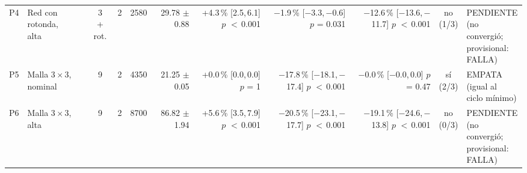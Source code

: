 \begin{table}[H]
\begin{tabular}{llcrrrrrrcl}
P4 & \makecell[l]{Red con\\{}rotonda,\\{}alta} & \makecell[c]{3\\{}+ rot.} & 2 & 2580 & \makecell[r]{29.78\\{}$\pm$ 0.88} & \makecell[r]{+4.3\,\%\\{}[2.5,\,6.1]\\$p$ $<$\,0.001} & \makecell[r]{$-$1.9\,\%\\{}[$-$3.3,\,$-$0.6]\\$p$ = 0.031} & \makecell[r]{$-$12.6\,\%\\{}[$-$13.6,\,$-$11.7]\\$p$ $<$\,0.001} & \makecell[c]{no\\{}(1/3)} & \makecell[l]{PENDIENTE\\{}(no convergió;\\{}provisional:\\{}FALLA)} \\
P5 & \makecell[l]{Malla $3 \times 3$,\\{}nominal} & 9 & 2 & 4350 & \makecell[r]{21.25\\{}$\pm$ 0.05} & \makecell[r]{+0.0\,\%\\{}[0.0,\,0.0]\\$p$ = 1} & \makecell[r]{$-$17.8\,\%\\{}[$-$18.1,\,$-$17.4]\\$p$ $<$\,0.001} & \makecell[r]{$-$0.0\,\%\\{}[$-$0.0,\,0.0]\\$p$ = 0.47} & \makecell[c]{sí\\{}(2/3)} & \makecell[l]{EMPATA\\{}(igual al\\{}ciclo mínimo)} \\
P6 & \makecell[l]{Malla $3 \times 3$,\\{}alta} & 9 & 2 & 8700 & \makecell[r]{86.82\\{}$\pm$ 1.94} & \makecell[r]{+5.6\,\%\\{}[3.5,\,7.9]\\$p$ $<$\,0.001} & \makecell[r]{$-$20.5\,\%\\{}[$-$23.1,\,$-$17.7]\\$p$ $<$\,0.001} & \makecell[r]{$-$19.1\,\%\\{}[$-$24.6,\,$-$13.8]\\$p$ $<$\,0.001} & \makecell[c]{no\\{}(0/3)} & \makecell[l]{PENDIENTE\\{}(no convergió;\\{}provisional:\\{}FALLA)} \\

\end{tabular}
\end{table}
